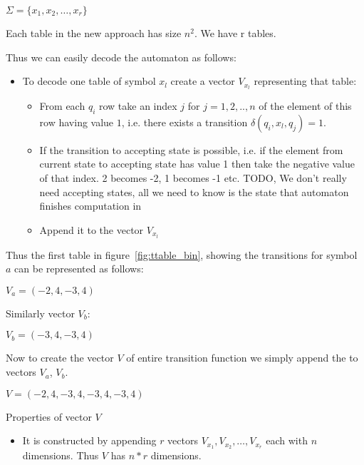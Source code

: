 \documentclass[runningheads,a4paper]{llncs}
\begin{document}
\begin{center}
	$\Sigma = \{x_1, x_2, \ldots, x_r\}$
\end{center}

Each table in the new approach has size $n^2$. We have r tables.

Thus we can easily decode the automaton as follows:
\begin{itemize}
\item To decode one table of symbol $x_l$ create a vector $V_{x_l}$ representing that table:
	\begin{itemize}
		\item From each $q_i$ row take an index $j$ for $j = 1,2,..,n$ of the element of this row having value $1$, i.e. there exists a transition $\delta(q_i, x_l, q_j) = 1$.
		\item If the transition to accepting state is possible, i.e. if the element from current state to accepting state has value 1 then take the negative value of that index. 2 becomes -2, 1 becomes -1 etc. {\color{red} TODO, We don't really need accepting states, all we need to know is the state that automaton finishes computation in}
		\item Append it to the vector $V_{x_l}$
	\end{itemize}
\end{itemize}

Thus the first table in figure~\ref{fig:ttable_bin}, showing the transitions for symbol $a$ can be represented as follows:

\begin{center}
	$V_a = (-2, 4, -3, 4)$
\end{center}

Similarly vector $V_b$:

\begin{center}
	$V_b = (-3, 4, -3, 4)$
\end{center}

Now to create the vector $V$ of entire transition function we simply append the to vectors $V_a$, $V_b$.

\begin{center}
	$V = (-2,4,-3,4,-3,4,-3,4)$
\end{center}

Properties of vector $V$
\begin{itemize}
	\item It is constructed by appending $r$ vectors $V_{x_1}, V_{x_2}, \ldots, V_{x_{r}}$ each with $n$ dimensions. Thus $V$ has $n * r$ dimensions.
	
\end{itemize}
\end{document}
